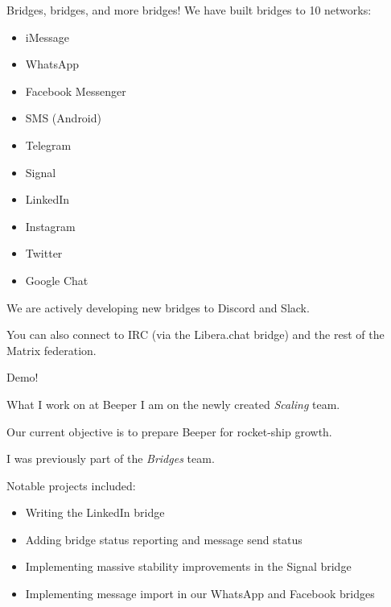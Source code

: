 \documentclass{beeper}
\begin{document}
\begin{frame}{Bridges, bridges, and more bridges!}
    We have built bridges to 10 networks:
    \begin{multicols}{2}
        \begin{itemize}
            \item iMessage
            \item WhatsApp
            \item Facebook Messenger
            \item SMS (Android)
            \item Telegram
            \item Signal
            \item LinkedIn
            \item Instagram
            \item Twitter
            \item Google Chat
        \end{itemize}
    \end{multicols}

    \pause
    We are actively developing new bridges to Discord and Slack.

    \pause
    You can also connect to IRC (via the Libera.chat bridge) and the rest of the
    Matrix federation.
\end{frame}

\begingroup
\def\insertframenumber{\relax}
\begin{frame}[standout]
    \Large
    Demo!
\end{frame}
\endgroup

\begin{frame}{What I work on at Beeper}
    I am on the newly created \textit{Scaling} team.

    Our current objective is to prepare Beeper for rocket-ship growth.
    \vspace{0.5cm}
    \pause

    I was previously part of the \textit{Bridges} team. 

    Notable projects included:
    \begin{itemize}
        \item Writing the LinkedIn bridge
        \item Adding bridge status reporting and message send status
        \item Implementing massive stability improvements in the Signal bridge
        \item Implementing message import in our WhatsApp and Facebook bridges
    \end{itemize}
\end{frame}
\end{document}
